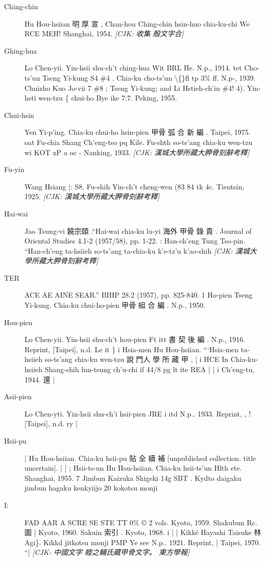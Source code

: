 \begin{description}
  \item[Ching-chin] Hu Hou-hsiian 明 厚 宣 , Chan-hou Ching-chin hsin-huo chia-ku-chi We RCE MEH! Shanghai, 1954. \hfill\textit{[CJK: 收集 殷文字合]}
  \item[Ghing-hua] Lo Chen-yii. Yin-hsii shu-ch't ching-hua Wit BRL He. N.p., 1914. tet Cho-ts'un Tseng Yi-kung S4 \#4 . Chia-ku cho-ts'un \textbackslash\{\}fl tp 3\% ff. N.p-, 1939. Chuizho Kuo Jo-vii 7 \#8 ; Tseng Yi-kung; and Li Hstieh-ch'in \#4! 4). Yin-hsti wen-tzu \{ chui-ho Bye ike 7:7. Peking, 1955.
  \item[Chui-hsin] Yen Yi-p'ing. Chia-ku chui-ho hsin-pien 甲骨 弧 合 新 編 . Taipei, 1975. oat Fu-chia Shang Ch'eng-tso pq Kile. Fu-shth so-ts'ang chia-ku wen-tzu wi KOT xP a oc - Nanking, 1933. \hfill\textit{[CJK: 漢城大學所藏大胛骨刻辭考釋]}
  \item[Fu-yin] Wang Hsiang |: S8. Fu-shih Yin-ch't cheng-wen (83 84 tk 4c. Tientsin, 1925. \hfill\textit{[CJK: 漢城大學所藏大胛骨刻辭考釋]}
  \item[Hai-wai] Jao Tsung-vi 饒宗頤 .``Hai-wai chia-ku lu-yi 海外 甲骨 錄 貴 . Journal of Oriental Studies 4.1-2 (1957/58), pp. 1-22. : Han-ch'eng Tung Tso-pin. ``Han-ch'eng ta-hsiieh so-ts'ang ta-chia-ku k'e-tz'u k'ao-shih \hfill\textit{[CJK: 漢城大學所藏大胛骨刻辭考釋]}
  \item[TER] ACE AE AINE SEAR.'' BIHP 28.2 (1957), pp. 825-840. 1 Ho-pien Tseng Yi-kung. Chia-ku chui-ho-pien 甲骨 組 合 編 . N.p., 1950.
  \item[Hou-pien] Lo Chen-yii. Yin-hsii shu-ch't hou-pien Ft itt 書 契 後 編 . N.p., 1916. Reprint, [Taipei], n.d. Le it \} i Hsia-men Hu Hou-hsiian. ```Hsia-men ta-hsiieh so-ts'ang chia-ku wen-tzu 說 門人 學 所 藏 甲 , | i HCE In Chia-ku-hsiieh Shang-shih lun-tsung ch'u-chi if 44/8 pg lt ite REA | | i Ch'eng-tu, 1944. 還 |
  \item[Asii-pien] Lo Chen-yti. Yin-hsii shu-ch'i hsii-pien JRE i itd N.p.. 1933. Reprint, , ! [Taipei], n.d. ry |
  \item[Hsii-pu] | Hu Hou-hsiian. Chia-ku hsii-pu 貼 全 續 補 [unpublished collection. title uncertain]. | | ; Hsii-ts-un Hu Hou-hsiian. Chia-ku hsii-ts'un Hlth ete. Shanghai, 1955. 7 Jimbun Kaizuka Shigeki 14g SBT . Kydto daigaku jimbun hagaku kenkyiijo 20 kokotsu monji
  \item[I:] FAD AAR A SCRE SE STE TT 0\% © 2 vols. Kyoto, 1959. Shakubun Rc. 圖 | Kyoto, 1960. Sakuin 索引 . Kyoto, 1968. i | | Kikké Hayashi Taisuke 林 Agi\}. Kikkd jitkotsu monji PMP Ye see N.p.. 1921. Reprint, | Taipei, 1970. ``| \hfill\textit{[CJK: 中國文字 睦之輔氏藏甲骨文字。 東方學報]}

\end{description}
